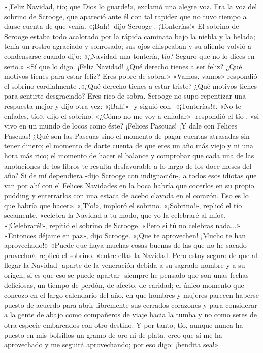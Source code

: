 \documentclass{novela}
\begin{document}
 «¡Feliz Navidad, tío; que Dios lo guarde!», exclamó una alegre voz. Era la voz del sobrino de Scrooge, que apareció ante él con tal rapidez que no tuvo tiempo a darse cuenta de que venía.
 «¡Bah! -dijo Scrooge-. ¡Tonterías!»
 El sobrino de Scrooge estaba todo acalorado por la rápida caminata bajo la niebla y la helada; tenía un rostro agraciado y sonrosado; sus ojos chispeaban y su aliento volvió a condensarse cuando dijo:
 «¿Navidad una tontería, tío? Seguro que no lo dices en serio.»
 «Sí que lo digo. ¡Feliz Navidad! ¿Qué derecho tienes a ser feliz? ¿Qué motivos tienes para estar feliz? Eres pobre de sobra.»
 «Vamos, vamos»-respondió el sobrino cordialmente-.«¿Qué derecho tienes a estar triste? ¿Qué motivos tienes para sentirte desgraciado? Eres rico de sobra.
 Scrooge no supo repentizar una respuesta mejor y dijo otra vez: «¡Bah!» -y siguió con- «¡Tonterías!».
 «No te enfades, tío», dijo el sobrino.
 «¿Cómo no me voy a enfadar» -respondió el tío-, «si vivo en un mundo de locos como éste? ¡Felices Pascuas! ¡Y dale con Felices Pascuas! ¿Qué son las Pascuas sino el momento de pagar cuentas atrasadas sin tener dinero; el momento de darte cuenta de que eres un año más viejo y ni una hora más rico; el momento de hacer el balance y comprobar que cada una de las anotaciones de los libros te resulta desfavorable a lo largo de los doce meses del año? Si de mí dependiera -dijo Scrooge con indignación-, a todos esos idiotas que van por ahí con el Felices Navidades en la boca habría que cocerlos en su propio pudding y enterrarlos con una estaca de acebo clavada en el corazón. Eso es lo que habría que hacer».
 «¡Tío!», imploró el sobrino.
 «¡Sobrino!», replicó el tío secamente, «celebra la Navidad a tu modo, que yo la celebraré al mío».
 «¡Celebraré!», repitió el sobrino de Scrooge. «Pero si tú no celebras nada...»
 «Entonces déjame en paz», dijo Scrooge. «¡Que te aprovechen! ¡Mucho te han aprovechado!»
 «Puede que haya muchas cosas buenas de las que no he sacado provecho», replicó el sobrino, «entre ellas la Navidad. Pero estoy seguro de que al llegar la Navidad -aparte de la veneración debida a su sagrado nombre y a su origen, si es que eso se puede apartar- siempre he pensado que son unas fechas deliciosas, un tiempo de perdón, de afecto, de caridad; el único momento que concozo en el largo calendario del año, en que hombres y mujeres parecen haberse puesto de acuerdo para abrir libremente sus cerrados corazones y para considerar a la gente de abajo como compañeros de viaje hacia la tumba y no como seres de otra especie embarcados con otro destino. Y por tanto, tío, aunque nunca ha puesto en mis bolsillos un gramo de oro ni de plata, creo que sí me ha aprovechado y me seguirá aprovechando; por eso digo: ¡bendita sea!»
\end{document}

